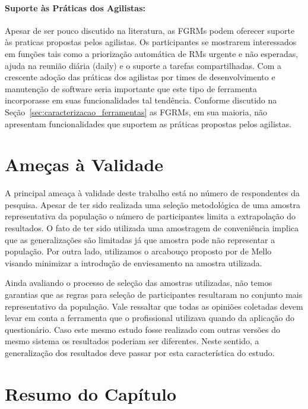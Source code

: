 \paragraph{Suporte às Práticas dos Agilistas:}
\label{par:pesq_profissionais_suporte_pratica_agilistas}

Apesar de ser pouco discutido na literatura, as FGRMs podem oferecer suporte às
praticas propostas pelos agilistas. Os participantes se mostrarem interessados
em funções tais como a priorização automática de RMs urgente e não esperadas,
ajuda na reunião diária (daily) e o suporte a tarefas compartilhadas. Com a
crescente adoção das práticas dos agilistas por times de desenvolvimento e
manutenção de software seria importante que este tipo de ferramenta incorporasse
em suas funcionalidades tal tendência. Conforme discutido na
Seção~\ref{sec:caracterizacao_ferramentas} as FGRMs, em sua maioria, não
apresentam funcionalidades que suportem as práticas propostas pelos agilistas.

\section{Ameças à Validade}
\label{sec:pesquisa_profissionais_ameacas_validade}

A principal ameaça à validade deste trabalho está no número de respondentes da
pesquisa. Apesar de ter sido realizada uma seleção metodológica de uma amostra
representativa da população o número de participantes limita a extrapolação do
resultados. O fato de ter sido utilizada uma amostragem de conveniência implica
que as generalizações são limitadas já que amostra pode não representar a
população. Por outra lado, utilizamos o arcabouço proposto por de
Mello~\cite{de2014towards} visando minimizar a introdução de enviesamento na
amostra utilizada.

Ainda avaliando o processo de seleção das amostras utilizadas, não temos
garantias que as regras para seleção de participantes resultaram no conjunto
mais representativo da população. Vale ressaltar que todas as opiniões coletadas
devem levar em conta a ferramenta que o profissional utilizava quando da
aplicação do questionário. Caso este mesmo estudo fosse realizado com outras
versões do mesmo sistema os resultados poderiam ser diferentes. Neste sentido, a
generalização dos resultados deve passar por esta característica do estudo.

\section{Resumo do Capítulo}
\label{sec:resumo_do_capitulo}

